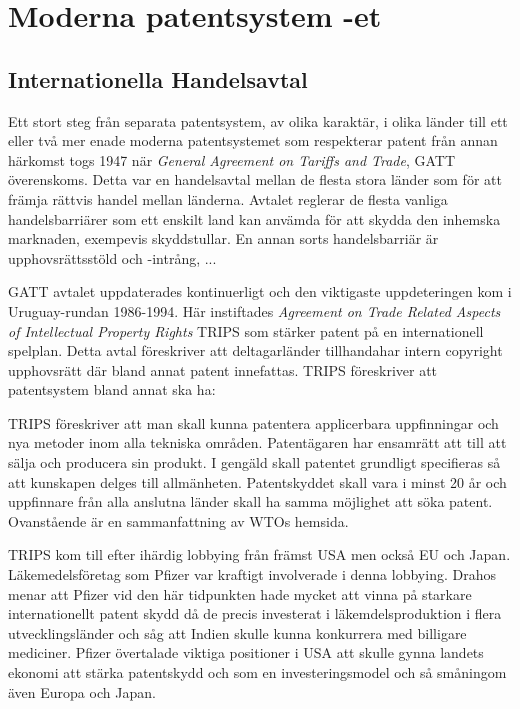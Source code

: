 \section{Moderna patentsystem -et}

\subsection{Internationella Handelsavtal}
Ett stort steg från separata patentsystem, av olika karaktär, i olika länder till ett eller två mer enade moderna patentsystemet som respekterar patent från annan härkomst togs 1947 när \emph{General Agreement on Tariffs and Trade}, GATT överenskoms. Detta var en handelsavtal mellan de flesta stora länder som för att främja rättvis handel mellan länderna. \cite{gatt} Avtalet reglerar de flesta vanliga handelsbarriärer som ett enskilt land kan anvämda för att skydda den inhemska marknaden, exempevis skyddstullar. En annan sorts handelsbarriär är upphovsrättsstöld och -intrång, ...

GATT avtalet uppdaterades kontinuerligt och den viktigaste uppdeteringen kom i Uruguay-rundan 1986-1994. Här instiftades \emph{Agreement on Trade Related Aspects of Intellectual Property Rights} TRIPS som stärker patent på en internationell spelplan. Detta avtal föreskriver att deltagarländer tillhandahar intern copyright upphovsrätt där bland annat patent innefattas. TRIPS föreskriver att patentsystem bland annat ska ha:

TRIPS föreskriver att man skall kunna patentera applicerbara uppfinningar och nya metoder inom alla tekniska områden. Patentägaren har ensamrätt att till att sälja och producera sin produkt. I gengäld skall patentet grundligt specifieras så att kunskapen delges till allmänheten. Patentskyddet skall vara  i minst 20 år och uppfinnare från alla anslutna länder skall ha samma möjlighet att söka patent. Ovanstående är en sammanfattning av WTOs hemsida\cite{wto}.

TRIPS kom till efter ihärdig lobbying från främst USA men också EU och Japan\cite{drahos}. Läkemedelsföretag som Pfizer var kraftigt involverade i denna lobbying\cite{drahos}. Drahos menar att Pfizer vid den här tidpunkten hade mycket att vinna på starkare internationellt patent skydd då de precis investerat i läkemdelsproduktion i flera utvecklingsländer och såg att Indien skulle kunna konkurrera med billigare mediciner\cite{drahos}. Pfizer övertalade viktiga positioner i USA att skulle gynna landets ekonomi att stärka patentskydd och \cite{Intelectual Property} som en investeringsmodel och så småningom även Europa och Japan\cite{drahos}.

